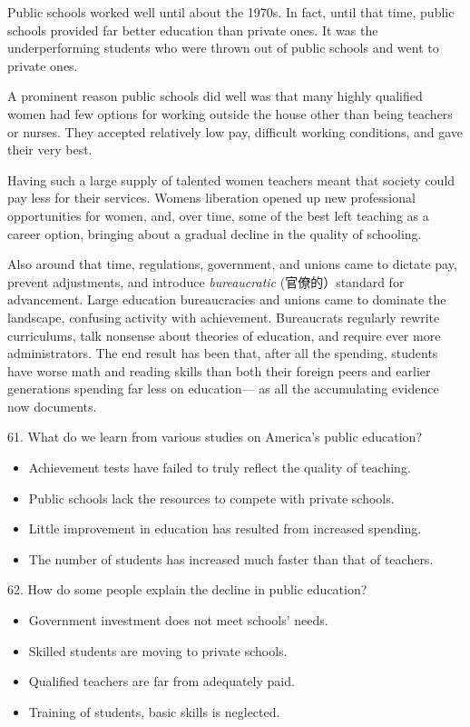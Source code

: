 \documentclass[UTF8,11pt]{ctexart}
\begin{document}
Public schools worked well until about the 1970s. In fact, until that time, public schools provided far better education than private ones. It was the underperforming students who were thrown out of public schools and went to private ones.


A prominent reason public schools did well was that many highly qualified women had few options for working outside the house other than being teachers or nurses. They accepted relatively low pay, difficult working conditions, and gave their very best.


Having such a large supply of talented women teachers meant that society could pay less for their services. Womens liberation opened up new professional opportunities for women, and, over time, some of the best left teaching as a career option, bringing about a gradual decline in the quality of schooling.


Also around that time, regulations, government, and unions came to dictate pay, prevent adjustments, and introduce \textit{bureaucratic} (官僚的）standard for advancement. Large education bureaucracies and unions came to dominate the landscape, confusing activity with achievement. Bureaucrats regularly rewrite curriculums, talk nonsense about theories of education, and require ever more administrators. The end result has been that, after all the spending, students have worse math and reading skills than both their foreign peers and earlier generations spending far less on education— as all the accumulating evidence now documents.


61. What do we learn from various studies on America’s public education?


\begin{itemize}[leftmargin=2em,itemsep=.2em,topsep=.4em]\item[A.] Achievement tests have failed to truly reflect the quality of teaching.
\item[B.] Public schools lack the resources to compete with private schools.
\item[C.] Little improvement in education has resulted from increased spending.
\item[D.] The number of students has increased much faster than that of teachers.
\end{itemize}

62. How do some people explain the decline in public education?


\begin{itemize}[leftmargin=2em,itemsep=.2em,topsep=.4em]\item[A.] Government investment does not meet schools’ needs.
\item[B.] Skilled students are moving to private schools.
\item[C.] Qualified teachers are far from adequately paid.
\item[D.] Training of students, basic skills is neglected.
\end{itemize}
\end{document}
